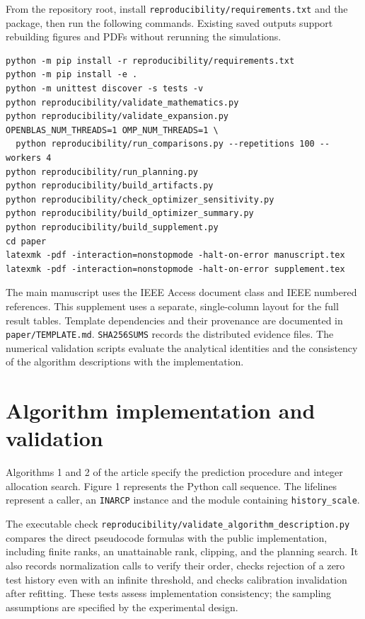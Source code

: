 \documentclass[10pt]{article}
\begin{document}
From the repository root, install \texttt{reproducibility/requirements.txt} and the package, then run the following commands. Existing saved outputs support rebuilding figures and PDFs without rerunning the simulations.
\begin{verbatim}
python -m pip install -r reproducibility/requirements.txt
python -m pip install -e .
python -m unittest discover -s tests -v
python reproducibility/validate_mathematics.py
python reproducibility/validate_expansion.py
OPENBLAS_NUM_THREADS=1 OMP_NUM_THREADS=1 \
  python reproducibility/run_comparisons.py --repetitions 100 --workers 4
python reproducibility/run_planning.py
python reproducibility/build_artifacts.py
python reproducibility/check_optimizer_sensitivity.py
python reproducibility/build_optimizer_summary.py
python reproducibility/build_supplement.py
cd paper
latexmk -pdf -interaction=nonstopmode -halt-on-error manuscript.tex
latexmk -pdf -interaction=nonstopmode -halt-on-error supplement.tex
\end{verbatim}
The main manuscript uses the IEEE Access document class and IEEE numbered references. This supplement uses a separate, single-column layout for the full result tables. Template dependencies and their provenance are documented in \texttt{paper/TEMPLATE.md}. \texttt{SHA256SUMS} records the distributed evidence files. The numerical validation scripts evaluate the analytical identities and the consistency of the algorithm descriptions with the implementation.

\section{Algorithm implementation and validation}
Algorithms 1 and 2 of the article specify the prediction procedure and integer allocation search. Figure 1 represents the Python call sequence. The lifelines represent a caller, an \texttt{INARCP} instance and the module containing \texttt{history\_scale}.

The executable check \texttt{reproducibility/validate\_algorithm\_description.py} compares the direct pseudocode formulas with the public implementation, including finite ranks, an unattainable rank, clipping, and the planning search. It also records normalization calls to verify their order, checks rejection of a zero test history even with an infinite threshold, and checks calibration invalidation after refitting. These tests assess implementation consistency; the sampling assumptions are specified by the experimental design.
\end{document}
